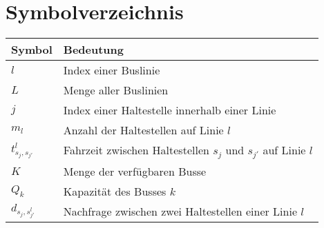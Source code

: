 \chapter*{Symbolverzeichnis}

\begin{longtable}[l]{@{}>{\centering\arraybackslash}p{5cm}p{11cm}@{}}
\textbf{Symbol} & \textbf{Bedeutung} \\
\midrule
$l$ & Index einer Buslinie \\
$L$ & Menge aller Buslinien \\
$j$ & Index einer Haltestelle innerhalb einer Linie \\
$m_l$ & Anzahl der Haltestellen auf Linie $l$ \\
$t_{s_j,s_{j'}}^l$ & Fahrzeit zwischen Haltestellen $s_j$ und $s_{j'}$ auf Linie $l$ \\
$K$ & Menge der verfügbaren Busse \\
$Q_k$ & Kapazität des Busses $k$ \\
$d_{s_j,s_{j'}^l}$ & Nachfrage zwischen zwei Haltestellen einer Linie $l$ \\
\end{longtable}
